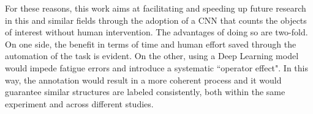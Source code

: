 For these reasons, this work aims at facilitating and speeding up future research in this and similar fields through the adoption of a CNN that counts the objects of interest without human intervention.
The advantages of doing so are two-fold. 
On one side, the benefit in terms of time and human effort saved through the automation of the task is evident.
On the other, using a Deep Learning model would impede fatigue errors and introduce a systematic ``operator effect".
In this way, the annotation would result in a more coherent process and it would guarantee similar structures are labeled consistently, both within the same experiment and across different studies.%
